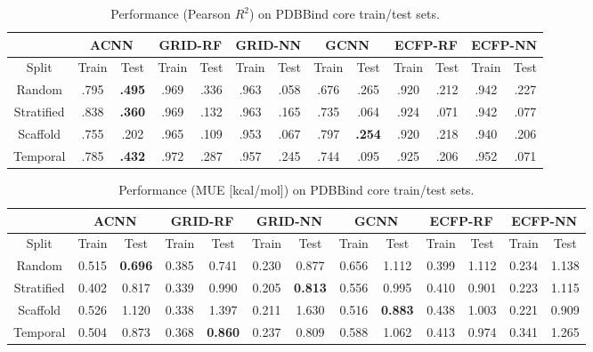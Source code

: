 \begin{table}[h]
  \centering
    \begin{tabular}{|c||c|c||c|c||c|c||c|c||c|c||c|c|}
    \hline
    \multicolumn{1}{|c||}{} & \multicolumn{2}{c||}{ACNN} & \multicolumn{2}{c||}{GRID-RF} & \multicolumn{2}{c||}{GRID-NN} & \multicolumn{2}{c||}{GCNN} & \multicolumn{2}{c||}{ECFP-RF} & \multicolumn{2}{c|}{ECFP-NN}\\
    \hline
    \hline
    Split & Train & Test & Train & Test & Train & Test & Train & Test & Train & Test & Train & Test \\
    \hline
    Random & .795 & \textbf{.495} & .969 & .336 & .963 & .058 & .676 & .265 & .920 & .212 & .942 & .227 \\
    Stratified & .838 & \textbf{.360} & .969 & .132 & .963 & .165 & .735 & .064 & .924 & .071 & .942 & .077 \\
    Scaffold & .755 & .202 & .965 & .109 & .953 & .067 & .797 & \textbf{.254} & .920 & .218 & .940 & .206 \\
    Temporal & .785 & \textbf{.432} & .972 & .287 & .957 & .245 & .744 & .095 & .925 & .206 & .952 & .071 \\
    \hline
    \end{tabular}
  \caption{Performance (Pearson $R^2$) on PDBBind core train/test sets.}
  \label{tab:core-pearson}
\end{table}
\begin{table}[h]
  \centering
    \begin{tabular}{|c||c|c||c|c||c|c||c|c||c|c||c|c|}
    \hline
    \multicolumn{1}{|c||}{} & \multicolumn{2}{c||}{ACNN} & \multicolumn{2}{c||}{GRID-RF} & \multicolumn{2}{c||}{GRID-NN} & \multicolumn{2}{c||}{GCNN} & \multicolumn{2}{c||}{ECFP-RF} & \multicolumn{2}{c|}{ECFP-NN}\\
    \hline
    \hline
    Split & Train & Test & Train & Test & Train & Test & Train & Test & Train & Test & Train & Test \\
    \hline
    Random & 0.515 & \textbf{0.696} & 0.385 & 0.741 & 0.230 & 0.877 & 0.656 & 1.112 & 0.399 & 1.112 & 0.234 & 1.138 \\
    Stratified & 0.402 & 0.817 & 0.339 & 0.990 & 0.205 & \textbf{0.813} & 0.556 & 0.995 & 0.410 & 0.901 & 0.223 & 1.115 \\
    Scaffold & 0.526 & 1.120 & 0.338 & 1.397 & 0.211 & 1.630 & 0.516 & \textbf{0.883} & 0.438 & 1.003 & 0.221 & 0.909 \\
    Temporal & 0.504 & 0.873 & 0.368 & \textbf{0.860} & 0.237 & 0.809 & 0.588 & 1.062 & 0.413 & 0.974 & 0.341 & 1.265 \\
    \hline
    \end{tabular}
  \caption{Performance (MUE [kcal/mol]) on PDBBind core train/test sets.}
  \label{tab:core-mae}
\end{table}


